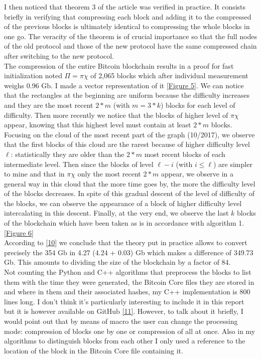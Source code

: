 \documentclass[12pt,a4paper]{article}
\newcommand{\source}[1]{\hyperlink{#1}{[#1]}}
\newcommand{\annexe}[2]{\hyperlink{#1}{[Figure #2]}}
\begin{document}
	I then noticed that theorem 3 of the article was verified in practice. It consists briefly in verifying that compressing each block and adding it to the compressed of the previous blocks is ultimately identical to compressing the whole blocks in one go. The veracity of the theorem is of crucial importance so that the full nodes of the old protocol and those of the new protocol have the same compressed chain after switching to the new protocol.\\
	
	The compression of the entire Bitcoin blockchain results in a proof for fast initialization noted $\Pi = \pi\chi$ of 2,065 blocks which after individual measurement weighs 0.96 Gb. I made a vector representation of it \annexe{25}{5}. We can notice that the rectangles at the beginning are uniform because the difficulty increases and they are the most recent $2*m$ (with $m = 3*k$) blocks for each level of difficulty. Then more recently we notice that the blocks of higher level of $\pi\chi$ appear, knowing that this highest level must contain at least $2*m$ blocks. Focusing on the cloud of the most recent part of the graph (10/2017), we observe that the first blocks of this cloud are the rarest because of higher difficulty level $\ell$: statistically they are older than the $2*m$ most recent blocks of each intermediate level. Then since the blocks of level $\ell - i$ (with $i \leq \ell$) are simpler to mine and that in $\pi\chi$ only the most recent $2*m$ appear, we observe in a general way in this cloud that the more time goes by, the more the difficulty level of the blocks decreases. In spite of this gradual descent of the level of difficulty of the blocks, we can observe the appearance of a block of higher difficulty level intercalating in this descent. Finally, at the very end, we observe the last $k$ blocks of the blockchain which have been taken as is in accordance with algorithm 1. \annexe{26}{6}\\
According to \source{10} we conclude that the theory put in practice allows to convert precisely the 354 Gb in 4.27 (4.24 + 0.03) Gb which makes a difference of 349.73 Gb. This amounts to dividing the size of the blockchain by a factor of 84.\\
	
	Not counting the Python and C++ algorithms that preprocess the blocks to list them with the time they were generated, the Bitcoin Core files they are stored in and where in them and their associated hashes, my C++ implementation is 800 lines long. I don't think it's particularly interesting to include it in this report but it is however available on GitHub \source{11}. However, to talk about it briefly, I would point out that by means of macro the user can change the processing mode: compression of blocks one by one or compression of all at once. Also in my algorithms to distinguish blocks from each other I only used a reference to the location of the block in the Bitcoin Core file containing it.
	
\end{document}
